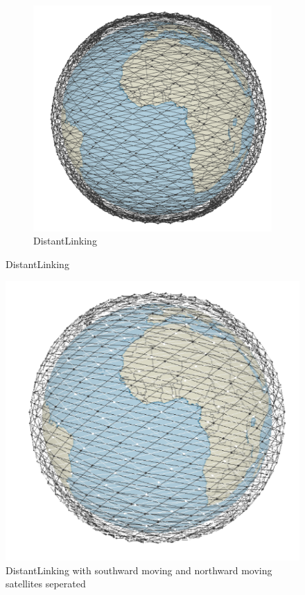 \documentclass[12pt]{report}
\begin{document}
\begin{figure}
\begin{subfigure}[b]{0.3\textwidth}
	\end{subfigure}
	\hfill
	\begin{subfigure}[b]{0.3\textwidth}
		\caption{DistantLinking}
		\includegraphics[width=\textwidth]{DistantLinking}
	\end{subfigure}
\end{figure}


\begin{figure}
	\centering
	\caption{DistantLinking with southward moving and northward moving satellites seperated}
	\label{fig:DistantLinking}
	\includegraphics[width=\textwidth]{DistantLinking2}
\end{figure}
\end{document}
